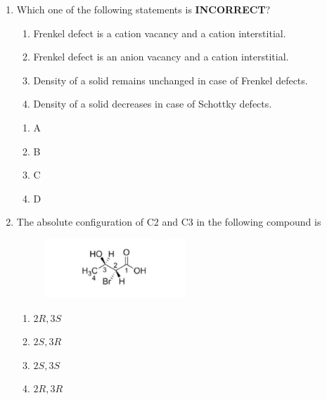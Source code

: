 \documentclass[journal,12pt,onecolumn]{exam}
\theoremstyle{remark}
\newcommand{\correct}{\textcolor{correctgreen}{\checkmark}}
\newcommand{\wrong}{\textcolor{wrongred}{\ding{55}}} %
\begin{document}
\begin{enumerate}
\item
Which one of the following statements is \textbf{INCORRECT}?

\begin{enumerate}
    \item Frenkel defect is a cation vacancy and a cation interstitial.
    \item Frenkel defect is an anion vacancy and a cation interstitial.
    \item Density of a solid remains unchanged in case of Frenkel defects.
    \item Density of a solid decreases in case of Schottky defects.
\end{enumerate}

\hfill{}

 

\begin{multicols}{2}
\begin{enumerate}
    \item \wrong A
    \item \correct B
    \item \wrong C
    \item \wrong D
\end{enumerate}
\end{multicols}

 


\item
The absolute configuration of C2 and C3 in the following compound is

\begin{figure}[H]
    \centering
    \includegraphics[width=0.5\textwidth]{figs/image1.jpg}
    \caption{}
    \label{fig:figure1}
   
\end{figure}

\begin{enumerate}
    \item $2R, 3S$
    \item $2S, 3R$
    \item $2S, 3S$
    \item $2R, 3R$
\end{enumerate}


\end{enumerate}
\end{document}
